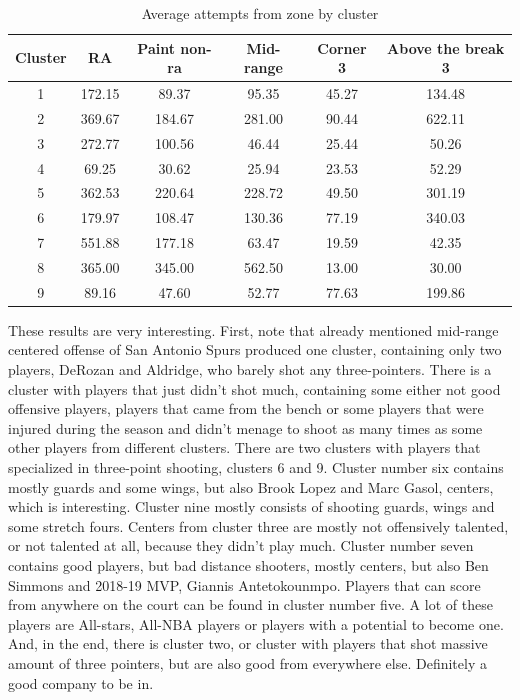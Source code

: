 \documentclass[a4paper]{article}
\begin{document}
\begin{table}[!h]
\begin{center}
\begin{tabular}{|c|c|c|c|c|c|} \hline
Cluster & RA & Paint non-ra & Mid-range & Corner 3 & Above the break 3 \\ \hline
 1 & 172.15 &  89.37 &  95.35 & 45.27 & 134.48 \\ \hline
 2 & 369.67 & 184.67 & 281.00 & 90.44 & 622.11 \\ \hline
 3 & 272.77 & 100.56 &  46.44 & 25.44 &  50.26 \\ \hline
 4 &  69.25 &  30.62 &  25.94 & 23.53 &  52.29 \\ \hline
 5 & 362.53 & 220.64 & 228.72 & 49.50 & 301.19 \\ \hline
 6 & 179.97 & 108.47 & 130.36 & 77.19 & 340.03 \\ \hline
 7 & 551.88 & 177.18 &  63.47 & 19.59 &  42.35 \\ \hline
 8 & 365.00 & 345.00 & 562.50 & 13.00 &  30.00 \\ \hline
 9 &  89.16 &  47.60 &  52.77 & 77.63 & 199.86 \\ \hline
\end{tabular}
\caption{Average attempts from zone by cluster}
\label{tab:avg_by_clst}
\end{center}
\end{table}

These results are very interesting. First, note that already mentioned mid-range centered offense of San Antonio Spurs produced one cluster, containing only two players, DeRozan and Aldridge, who barely shot any three-pointers. There is a cluster with players that just didn't shot much, containing some either not good offensive players, players that came from the bench or some players that were injured during the season and didn't menage to shoot as many times as some other players from different clusters. There are two clusters with players that specialized in three-point shooting, clusters 6 and 9. Cluster number six contains mostly guards and some wings, but also Brook Lopez and Marc Gasol, centers, which is interesting. Cluster nine mostly consists of shooting guards, wings and some stretch fours. Centers from cluster three are mostly not offensively talented, or not talented at all, because they didn't play much. Cluster number seven contains good players, but bad distance shooters, mostly centers, but also Ben Simmons and 2018-19 MVP, Giannis Antetokounmpo. Players that can score from anywhere on the court can be found in cluster number five. A lot of these players are All-stars, All-NBA players or players with a potential to become one. And, in the end, there is cluster two, or cluster with players that shot massive amount of three pointers, but are also good from everywhere else. Definitely a good company to be in.
\end{document}
